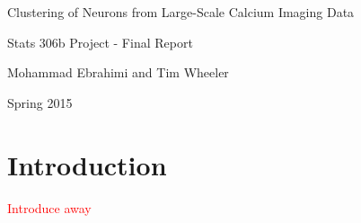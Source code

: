\documentclass[10pt]{article}
\newcommand{\calcium}[0]{Ca\textsuperscript{2+}}
\newcommand{\todo}[1]{\textcolor{red}{#1}}
\begin{document}
\begin{center}
    {\LARGE Clustering of Neurons from Large-Scale Calcium Imaging Data}

    Stats 306b Project - Final Report

    Mohammad Ebrahimi and Tim Wheeler

    Spring 2015
\end{center}

\begin{abstract}
Fluorescent imaging allows for the analysis of signalling behavior on a per-neuron basis in anesthetized and awake behaving animals. %
Existing methods monitor {\calcium} dynamics over a large region, but recently developed automated methods allow for isolating signals and associating them with particular neurons.
The resulting set of candidate neurons suffers from the presence of background structures such as blood vessels.
This project applies clustering methods to candidate objects in a one-photon {\calcium} dataset for the classification of neurons from background structures.
\todo{Hierarchical clustering was performed to identify preliminary classes.}
\todo{Principle component analysis was performed to identify preliminary important features and a clustering analysis was conducted using the first two principle components.}
\todo{Sparse clustering and sparse principle component analysis were conducted to identify a reduced featureset which captures the majority of the variation in the data.}
\todo{Group validation was performed by comparing the clusters obtained in the first dataset to the clusters obtained in a withheld dataset.}
\todo{Results indicate...}
\end{abstract}


\section{Introduction}

\todo{Introduce away}

\end{document}
